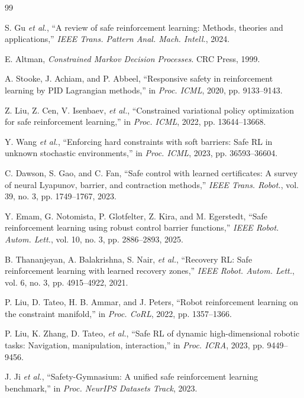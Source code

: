 \documentclass[letterpaper, 10 pt, conference]{ieeeconf}
\begin{document}
\FloatBarrier

\begin{thebibliography}{99}

S. Gu \emph{et al.}, ``A review of safe reinforcement learning: Methods, theories and applications,'' \emph{IEEE Trans. Pattern Anal. Mach. Intell.}, 2024.

E. Altman, \emph{Constrained Markov Decision Processes}. CRC Press, 1999.

A. Stooke, J. Achiam, and P. Abbeel, ``Responsive safety in reinforcement learning by PID Lagrangian methods,'' in \emph{Proc. ICML}, 2020, pp. 9133--9143.

Z. Liu, Z. Cen, V. Isenbaev, \emph{et al.}, ``Constrained variational policy optimization for safe reinforcement learning,'' in \emph{Proc. ICML}, 2022, pp. 13644--13668.

Y. Wang \emph{et al.}, ``Enforcing hard constraints with soft barriers: Safe RL in unknown stochastic environments,'' in \emph{Proc. ICML}, 2023, pp. 36593--36604.

C. Dawson, S. Gao, and C. Fan, ``Safe control with learned certificates: A survey of neural Lyapunov, barrier, and contraction methods,'' \emph{IEEE Trans. Robot.}, vol. 39, no. 3, pp. 1749--1767, 2023.

Y. Emam, G. Notomista, P. Glotfelter, Z. Kira, and M. Egerstedt, ``Safe reinforcement learning using robust control barrier functions,'' \emph{IEEE Robot. Autom. Lett.}, vol. 10, no. 3, pp. 2886--2893, 2025.

B. Thananjeyan, A. Balakrishna, S. Nair, \emph{et al.}, ``Recovery RL: Safe reinforcement learning with learned recovery zones,'' \emph{IEEE Robot. Autom. Lett.}, vol. 6, no. 3, pp. 4915--4922, 2021.

P. Liu, D. Tateo, H. B. Ammar, and J. Peters, ``Robot reinforcement learning on the constraint manifold,'' in \emph{Proc. CoRL}, 2022, pp. 1357--1366.

P. Liu, K. Zhang, D. Tateo, \emph{et al.}, ``Safe RL of dynamic high-dimensional robotic tasks: Navigation, manipulation, interaction,'' in \emph{Proc. ICRA}, 2023, pp. 9449--9456.

J. Ji \emph{et al.}, ``Safety-Gymnasium: A unified safe reinforcement learning benchmark,'' in \emph{Proc. NeurIPS Datasets Track}, 2023.


\end{thebibliography}
\end{document}
